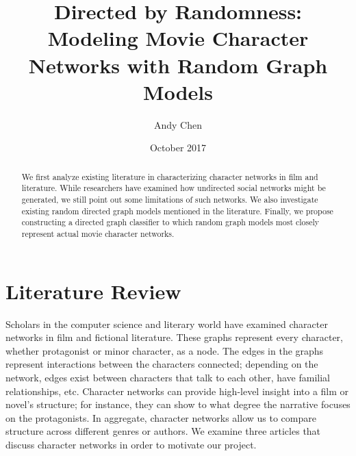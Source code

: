 \documentclass{article}
\title{Directed by Randomness: Modeling Movie Character Networks with Random Graph Models}
\author{Andy Chen}
\date{October 2017}
\begin{document}
\maketitle

\begin{abstract}
We first analyze existing literature in characterizing character networks in film and literature. While researchers have examined how undirected social networks might be generated, we still point out some limitations of such networks. We also investigate existing random directed graph models mentioned in the literature. Finally, we propose constructing a directed graph classifier to which random graph models most closely represent actual movie character networks.
\end{abstract}

\section{Literature Review}
Scholars in the computer science and literary world have examined character networks in film and fictional literature. These graphs represent every character, whether protagonist or minor character, as a node. The edges in the graphs represent interactions between the characters connected; depending on the network, edges exist between characters that talk to each other, have familial relationships, etc.
\newline\newline
Character networks can provide high-level insight into a film or novel's structure; for instance, they can show to what degree the narrative focuses on the protagonists. In aggregate, character networks allow us to compare structure across different genres or authors. 
\newline\newline
We examine three articles that discuss character networks in order to motivate our project.
\end{document}
